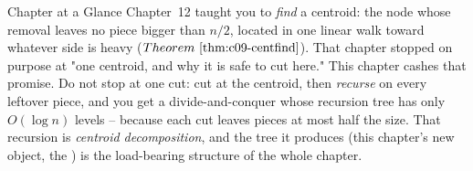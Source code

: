 
\begin{chaptertheorybox}{Chapter at a Glance}
Chapter~12 taught you to \emph{find} a centroid: the node whose removal leaves
no piece bigger than \(n/2\), located in one linear walk toward whatever side is
heavy (\(\thmref{c09-centfind}\)).  That chapter stopped on purpose at "one
centroid, and why it is safe to cut here."  This chapter cashes that promise.  Do
not stop at one cut: cut at the centroid, then \emph{recurse} on every leftover
piece, and you get a divide-and-conquer whose recursion tree has only
\(O(\log n)\) levels -- because each cut leaves pieces at most half the size.  That
recursion is \emph{centroid decomposition}, and the tree it produces (this
chapter's new object, the ) is the load-bearing structure of
the whole chapter.


\end{chaptertheorybox}
